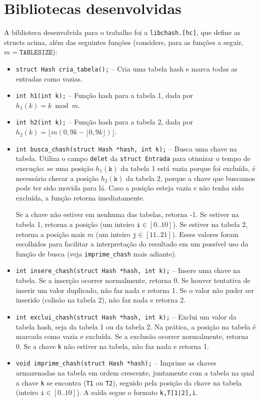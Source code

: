 \documentclass[a4paper, 11pt]{article}
\begin{document}
\section{Bibliotecas desenvolvidas}
A biblioteca desenvolvida para o trabalho foi a \texttt{libchash.[hc]}, que define as
structs acima, além das seguintes funções (considere, para as funções a seguir,
$m = \texttt{TABLESIZE}$):
\begin{itemize}
    \item \texttt{struct Hash cria\_tabela();} -- Cria uma tabela hash e marca todas as
        entradas como vazias.
    \item \texttt{int h1(int k);} -- Função hash para a tabela 1, dada por
        $h_1(k) = k \bmod m$.
    \item \texttt{int h2(int k);} -- Função hash para a tabela 2, dada por 
        $h_2(k) = \lfloor m(0,9k - \lfloor 0,9k \rfloor) \rfloor$.
    \item \texttt{int busca\_chash(struct Hash *hash, int k);} -- Busca uma chave na
        tabela. Utiliza o campo \texttt{delet} da \texttt{struct Entrada} para otimizar
        o tempo de execução: se uma posição $h_1(\texttt{k})$ da tabela 1 está vazia
        porque foi excluída, é necessário checar a posição $h_2(\texttt{k})$ da tabela
        2, porque a chave que buscamos pode ter sido movida para lá. Caso a posição
        esteja vazia e não tenha sido excluída, a função retorna imediatamente.

        Se a chave não estiver em nenhuma das tabelas, retorna -1. Se estiver na tabela
        1, retorna a posição (um inteiro $\texttt{i} \in [0..10]$). Se estiver na tabela
        2, retorna a posição mais $m$ (um inteiro $\texttt{j} \in [11..21]$). Esses
        valores foram escolhidos para facilitar a interpretação do resultado em um
        possível uso da função de busca (veja \texttt{imprime\_chash} mais adiante).
    \item \texttt{int insere\_chash(struct Hash *hash, int k);} -- Insere uma chave na
        tabela. Se a inserção ocorrer normalmente, retorna 0. Se houver tentativa de
        inserir um valor duplicado, não faz nada e retorna 1. Se o valor não puder ser
        inserido (colisão na tabela 2), não faz nada e retorna 2.
    \item \texttt{int exclui\_chash(struct Hash *hash, int k);} -- Exclui um valor da
        tabela hash, seja da tabela 1 ou da tabela 2. Na prática, a posição na tabela é
        marcada como vazia e excluída. Se a exclusão ocorrer normalmente, retorna 0.
        Se a chave \texttt{k} não estiver na tabela, não faz nada e retorna 1.
    \item \texttt{void imprime\_chash(struct Hash *hash);} -- Imprime as chaves
        armazenadas na tabela em ordem crescente, juntamente com a tabela na qual a
        chave \texttt{k} se encontra (\texttt{T1} ou \texttt{T2}), seguido pela posição
        da chave na tabela (inteiro $\texttt{i} \in [0..10]$). A saída segue o formato
        \texttt{k,T[1|2],i}.


\end{itemize}
\end{document}
